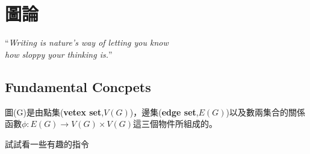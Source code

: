 \chapter{圖論}
	\begin{flushright}
		\begin{minipage}[r]{0.7\textwidth}
			\begin{flushright}
			``\textit{Writing is nature’s way of letting you know\\ how sloppy your thinking is.}''
			\\[5pt]
		\end{flushright}
		\end{minipage}
	\end{flushright}
\section{Fundamental Concpets}
\theoremstyle{definition}
\begin{definition}[graph]
	圖(G)是由點集(\textbf{vetex set},$V(G)$)，邊集(\textbf{edge set},$E(G)$)以及數兩集合的關係函數$\phi:E(G)\rightarrow V(G)\times V(G)$這三個物件所組成的。
\end{definition}
試試看一些有趣的指令

